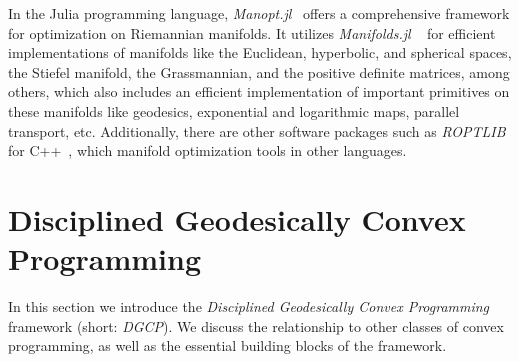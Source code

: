 \documentclass[twoside,11pt]{article}
\begin{document}
In the Julia programming language, \textsl{Manopt.jl}~\citep{manoptjl} offers a comprehensive framework for optimization on Riemannian manifolds. It utilizes \textsl{Manifolds.jl} ~\citep{axen2023manifolds} for efficient implementations of manifolds like the Euclidean, hyperbolic, and spherical spaces, the Stiefel manifold, the Grassmannian, and the positive definite matrices, among others, which also includes an efficient implementation of important primitives on these manifolds like geodesics, exponential and logarithmic maps, parallel transport, etc. 
Additionally, there are other software packages such as \textsl{ROPTLIB} for C++~\citep{roptlib}, which manifold optimization tools in other languages.



\section{Disciplined Geodesically Convex Programming}
In this section we introduce the \emph{Disciplined Geodesically Convex Programming} framework (short: \emph{DGCP}). We discuss the relationship to other classes of convex programming, as well as the essential building blocks of the framework.
\end{document}
